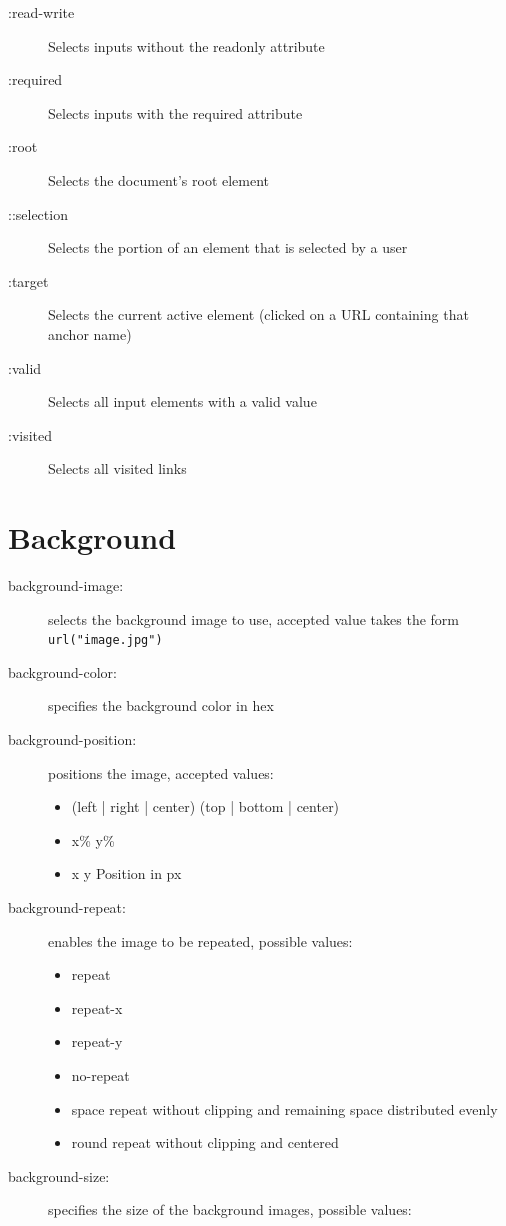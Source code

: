 \documentclass[12pt, a4paper]{article}
\begin{document}
\begin{multicols*}{2}
\begin{description}
			\item[:read-write] Selects inputs without the readonly attribute
			\item[:required] Selects inputs with the required attribute
			\item[:root] Selects the document's root element
			\item[::selection] Selects the portion of an element that is selected by a user
			\item[:target] Selects the current active element (clicked on a URL containing that anchor name)
			\item[:valid] Selects all input elements with a valid value
			\item[:visited] Selects all visited links
		\end{description}
		
		\section{Background}
		\begin{description}
			\item[background-image:] selects the background image to use, accepted value takes the form \texttt{url("image.jpg")}
			\item[background-color:] specifies the background color in hex
			\item[background-position:] positions the image, accepted values: 
			\begin{itemize}
				\item (left | right | center) (top | bottom | center)
				\item x\% y\%
				\item x y 
				\subitem Position in px
			\end{itemize}
			\item[background-repeat:] enables the image to be repeated, possible values:
			\begin{itemize}
				\item repeat
				\item repeat-x
				\item repeat-y
				\item no-repeat
				\item space
				\subitem repeat without clipping and remaining space distributed evenly
				\item round
				\subitem repeat without clipping and centered	
			\end{itemize}
			\item[background-size:] specifies the size of the background images, possible values:

\end{description}
\end{multicols*}
\end{document}
